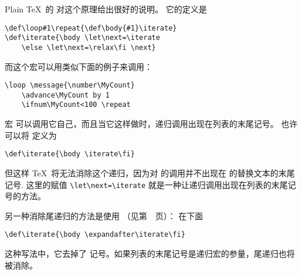 \documentclass[letterpaper]{book}
\begin{document}
Plain \TeX\ 的  对这个原理给出很好的说明。
\label{loop:ex}它的定义是
\begin{verbatim}
\def\loop#1\repeat{\def\body{#1}\iterate}
\def\iterate{\body \let\next=\iterate
    \else \let\next=\relax\fi \next}
\end{verbatim}
而这个宏可以用类似下面的例子来调用：
\begin{verbatim}
\loop \message{\number\MyCount}
    \advance\MyCount by 1
    \ifnum\MyCount<100 \repeat
\end{verbatim}
宏  可以调用它自己，而且当它这样做时，递归调用出现在列表的末尾记号。
也许可以将  定义为
\begin{verbatim}
\def\iterate{\body \iterate\fi}
\end{verbatim}
但这样 \TeX\ 将无法消除这个递归，因为对  的调用并不出现在
 的替换文本的末尾记号. 这里的赋值 \verb>\let\next=\iterate>
就是一种让递归调用出现在列表的末尾记号的方法。

另一种消除尾递归的方法是使用 （见第~\pageref{after:cond}~页）：
在下面
\begin{verbatim}
\def\iterate{\body \expandafter\iterate\fi}
\end{verbatim}
这种写法中，它去掉了  记号。如果列表的末尾记号是递归宏的参量，尾递归也将被消除。
\end{document}
